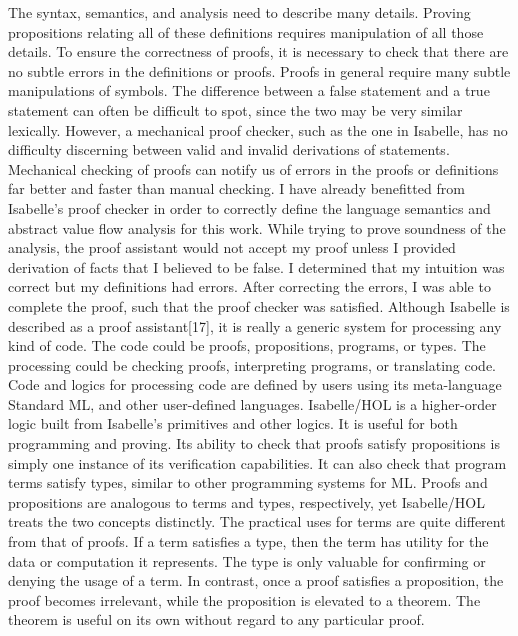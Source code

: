 \documentclass{article}
\begin{document}
	The syntax, semantics, and analysis need to describe many details.  Proving propositions relating all of these definitions requires manipulation of all those details.  To ensure the correctness of proofs, it is necessary to check that there are no subtle errors in the definitions or proofs.  Proofs in general require many subtle manipulations of symbols.  The difference between a false statement and a true statement can often be difficult to spot, since the two may be very similar lexically.  However, a mechanical proof checker, such as the one in Isabelle, has no difficulty discerning between valid and invalid derivations of statements.  Mechanical checking of proofs can notify us of errors in the proofs or definitions far better and faster than manual checking.  I have already benefitted from Isabelle's proof checker in order to correctly define the language semantics and abstract value flow analysis for this work.  While trying to prove soundness of the analysis, the proof assistant would not accept my proof unless I provided derivation of facts that I believed to be false.  I determined that my intuition was correct but my definitions had errors.  After correcting the errors, I was able to complete the proof, such that the proof checker was satisfied.
	Although Isabelle is described as a proof assistant[17], it is really a generic system for processing any kind of code.  The code could be proofs, propositions, programs, or types.  The processing could be checking proofs, interpreting programs, or translating code.  Code and logics for processing code are defined by users using its meta-language Standard ML, and other user-defined languages.  Isabelle/HOL is a higher-order logic built from Isabelle's primitives and other logics.  It is useful for both programming and proving.  Its ability to check that proofs satisfy propositions is simply one instance of its verification capabilities.  It can also check that program terms satisfy types, similar to other programming systems for ML.  Proofs and propositions are analogous to terms and types, respectively, yet Isabelle/HOL treats the two concepts distinctly.  The practical uses for terms are quite different from that of proofs.  If a term satisfies a type, then the term has utility for the data or computation it represents.  The type is only valuable for confirming or denying the usage of a term.  In contrast, once a proof satisfies a proposition, the proof becomes irrelevant, while the proposition is elevated to a theorem.  The theorem is useful on its own without regard to any particular proof.
\end{document}
